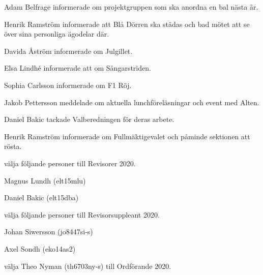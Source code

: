 \documentclass[10pt]{article}
\begin{document}
\begin{paragrafer}
\textbf{}

%

Adam Belfrage informerade om projektgruppen som ska anordna en bal nästa år. 

Henrik Ramström informerade att Blå Dörren ska städas och bad mötet att se över sina personliga ägodelar där.

Davida Åström informerade om Julgillet.

Elsa Lindhé informerade att om Sångarstriden.

Sophia Carlsson informerade om F1 Röj.

Jakob Pettersson meddelade om aktuella lunchföreläsningar och event med Alten.

Daniel Bakic tackade Valberedningen för deras arbete.


Henrik Ramström informerade om Fullmäktigevalet och påminde sektionen att rösta.

\begin{paralist}

    \Mba välja följande personer till Revisorer 2020.
    \begin{tightdashlist}
        \item Magnus Lundh (elt15mlu)
        \item Daniel Bakic (elt15dba)
    \end{tightdashlist}

    \Mba välja följande personer till Revisorsuppleant 2020.
    \begin{tightdashlist}
        \item Johan Siwersson (jo8447si-s)
        \item Axel Sondh (eko14as2)
    \end{tightdashlist}
    

    \Mba välja Theo Nyman (th6703ny-s) till Ordförande 2020.


\end{paralist}
\end{paragrafer}
\end{document}
